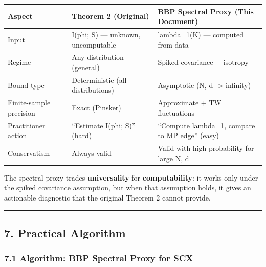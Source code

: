 \documentclass[
  12pt,
]{article}
\begin{document}
\begin{longtable}[]{@{}
  >{\raggedright\arraybackslash}p{}
  >{\raggedright\arraybackslash}p{}
  >{\raggedright\arraybackslash}p{}@{}}
\toprule\noalign{}
\begin{minipage}[b]{\linewidth}\raggedright
Aspect
\end{minipage} & \begin{minipage}[b]{\linewidth}\raggedright
Theorem 2 (Original)
\end{minipage} & \begin{minipage}[b]{\linewidth}\raggedright
BBP Spectral Proxy (This Document)
\end{minipage} \\
\midrule\noalign{}
\endhead
\bottomrule\noalign{}
\endlastfoot
Input & I(phi; S) --- unknown, uncomputable & lambda\_1(K) --- computed
from data \\
Regime & Any distribution (general) & Spiked covariance + isotropy \\
Bound type & Deterministic (all distributions) & Asymptotic (N, d
-\textgreater{} infinity) \\
Finite-sample precision & Exact (Pinsker) & Approximate + TW
fluctuations \\
Practitioner action & ``Estimate I(phi; S)'' (hard) & ``Compute
lambda\_1, compare to MP edge'' (easy) \\
Conservatism & Always valid & Valid with high probability for large N,
d \\
\end{longtable}

The spectral proxy trades \textbf{universality} for
\textbf{computability}: it works only under the spiked covariance
assumption, but when that assumption holds, it gives an actionable
diagnostic that the original Theorem 2 cannot provide.

\begin{center}\rule{0.5\linewidth}{0.5pt}\end{center}

\subsection{7. Practical Algorithm}\label{practical-algorithm}

\subsubsection{7.1 Algorithm: BBP Spectral Proxy for
SCX}\label{algorithm-bbp-spectral-proxy-for-scx}
\end{document}
